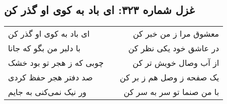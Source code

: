 \begin{center}
\section*{غزل شماره ۳۲۳: ای باد به کوی او گذر کن}
\label{sec:323}
\begin{longtable}{l p{0.5cm} r}
ای باد به کوی او گذر کن
&&
معشوق مرا ز من خبر کن
\\
با دلبر من بگو که جانا
&&
در عاشق خود یکی نظر کن
\\
چوبی که ز هجر تو بود خشک
&&
از آب وصال خویش تر کن
\\
صد دفتر هجر حفظ کردی
&&
یک صفحه ز وصل هم ز بر کن
\\
ور نیک نمی‌کنی به جایم
&&
با من صنما تو سر به سر کن
\\
\end{longtable}
\end{center}
